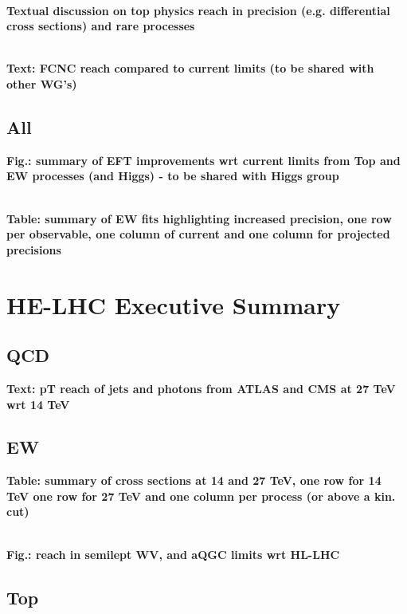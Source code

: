 \documentclass{article}
\begin{document}
\\
{\bf Textual discussion on top physics reach in precision (e.g. differential cross sections) and rare processes}


\\
{\bf Text: FCNC reach compared to current limits (to be shared with other WG's)}

\subsection{All}


{\bf Fig.: summary of EFT improvements wrt current limits from Top and EW processes (and Higgs) - to be shared with Higgs group}


\\
{\bf Table: summary of EW fits highlighting increased precision, one row per observable, one column of current and one column for projected precisions}



\clearpage
\section{HE-LHC Executive Summary}

\subsection{QCD}

{\bf Text: pT reach of jets and photons from ATLAS and CMS at 27 TeV wrt 14 TeV}

\subsection{EW}

{\bf Table: summary of cross sections at 14 and 27 TeV, one row for 14 TeV one row for 27 TeV and one column per process (or above a kin. cut) }



\\
{\bf Fig.: reach in semilept WV, and aQGC limits wrt HL-LHC}



\subsection{Top}
\end{document}

